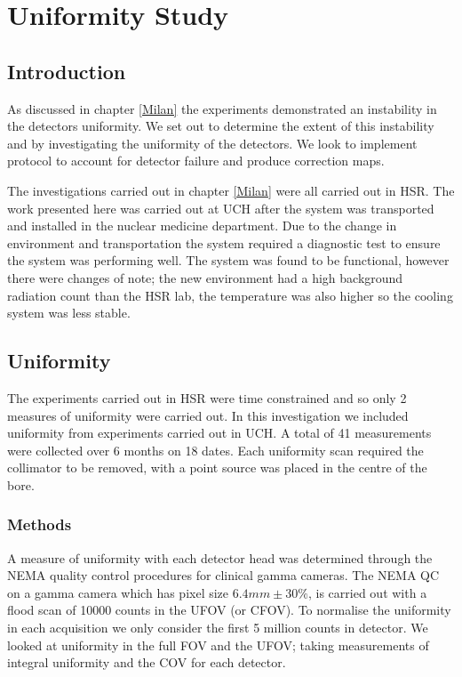 \chapter{Uniformity Study}
\label{Linearity}

\section{Introduction}
As discussed in chapter \ref{Milan} the experiments demonstrated an instability in the detectors uniformity. We set out to determine the extent of this instability and by investigating the uniformity of the detectors. We look to implement protocol to account for detector failure and produce correction maps.

The investigations carried out in chapter \ref{Milan} were all carried out in \acrshort{HSR}. The work presented here was carried out at \acrlong{UCH} after the system was transported and installed in the nuclear medicine department. Due to the change in environment and transportation the system required a diagnostic test to ensure the system was performing well. The system was found to be functional, however there were changes of note; the new environment had a high background radiation count than the \acrshort{HSR} lab, the temperature was also higher so the cooling system was less stable. 

\section{Uniformity}
The experiments carried out in \acrshort{HSR} were time constrained and so only 2 measures of uniformity were carried out. In this investigation we included uniformity from experiments carried out in \acrshort{UCH}. A total of 41 measurements were collected over 6 months on 18 dates. Each uniformity scan required the collimator to be removed, with a point source was placed in the centre of the bore.  
\subsection{Methods}
A measure of uniformity with each detector head was determined through the NEMA quality control procedures for clinical gamma cameras. The \acrshort{NEMA} QC on a gamma camera which has pixel size $6.4 mm \pm 30\%$, is carried out with a flood scan of 10000 counts in the \acrlong{UFOV} (or \acrlong{CFOV}). To normalise the uniformity in each acquisition we only consider the first 5 million counts in detector. We looked at uniformity in the full \acrshort{FOV} and the \acrshort{UFOV}; taking measurements of integral uniformity and the \acrlong{COV} for each detector. 

